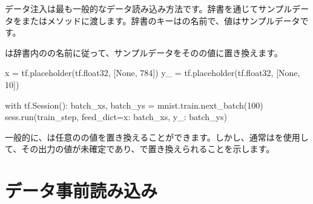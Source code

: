 \begin{content}

データ注入は最も一般的なデータ読み込み方法です。辞書を通じてサンプルデータをまたはメソッドに渡します。辞書のキーはの名前で、値はサンプルデータです。

は辞書内のの名前に従って、サンプルデータをそのの値に置き換えます。


\begin{leftbar}
\begin{python}
x = tf.placeholder(tf.float32, [None, 784])
y_ = tf.placeholder(tf.float32, [None, 10])

with tf.Session():
  batch_xs, batch_ys = mnist.train.next_batch(100)
  sess.run(train_step, feed_dict={x: batch_xs, y_: batch_ys})
\end{python}
\end{leftbar}

一般的に、は任意のの値を置き換えることができます。しかし、通常はを使用して、その出力の値が未確定であり、で置き換えられることを示します。

\end{content}

\section{データ事前読み込み}


